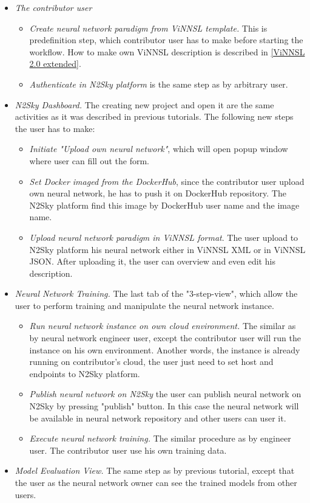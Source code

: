 \begin{itemize}
\item \emph{The contributor user} 
\begin{itemize}
\item \emph{Create neural network paradigm from ViNNSL template.} This is predefinition step, which contributor user has to make before starting the workflow. How to make own ViNNSL description is described in \autoref{ViNNSL 2.0 extended}.
\item \emph{Authenticate in N2Sky platform} is the same step as by arbitrary user.
\end{itemize}
\item \emph{N2Sky Dashboard.} The creating new project and open it are the same activities as it was described in previous tutorials. The following new steps the user has to make:
\begin{itemize}
\item \emph{Initiate "Upload own neural network"}, which will open popup window where user can fill out the form.
\item \emph{Set Docker imaged from the DockerHub}, since the contributor user upload own neural network, he has to push it on DockerHub repository. The N2Sky platform find this image by DockerHub user name and the image name.
\item \emph{Upload neural network paradigm in ViNNSL format}. The user upload to N2Sky platform his neural network either in ViNNSL XML or in ViNNSL JSON. After uploading it, the user can overview and even edit his description.
\end{itemize}
\item \emph{Neural Network Training.} The last tab of the "3-step-view", which allow the user to perform training and manipulate the neural network instance.
\begin{itemize}
\item \emph{Run neural network instance on own cloud environment.} The similar as by neural network engineer user, except the contributor user will run the instance on his own environment. Another words, the instance is already running on contributor's cloud, the user just need to set host and endpoints to N2Sky platform.
\item \emph{Publish neural network on N2Sky} the user can publish neural network on N2Sky by pressing "publish" button. In this case the neural network will be available in neural network repository and other users can user it.
\item \emph{Execute neural network training.} The similar procedure as by engineer user. The contributor user use his own training data.
\end{itemize}
\item \emph{Model Evaluation View.} The same step as by previous tutorial, except that the user as the neural network owner can see the trained models from other users.

\end{itemize}

